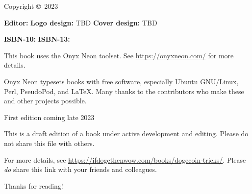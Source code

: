 \thispagestyle{empty}

\huge{\booktitle}
\newline
\large{\booksubtitle}
\newline
\newline
\normalsize

Copyright \copyright~2023 \bookauthor

\vfill
\textbf{Editor:} \bookauthor\newline
\textbf{Logo design:} TBD\newline
\textbf{Cover design:} TBD

\textbf{ISBN-10:} \bookisbnten\newline
\textbf{ISBN-13:} \bookisbnthirteen

This book uses the Onyx Neon toolset. See \url{https://onyxneon.com/} for more
details.

Onyx Neon typesets books with free software, especially Ubuntu GNU/Linux, Perl,
PseudoPod, and \LaTeX. Many thanks to the contributors who make these and other
projects possible.

First edition coming late 2023

This is a draft edition of a book under active development and editing. Please do not share this file with others.

For more details, see \url{https://ifdogethenwow.com/books/dogecoin-tricks/}.
Please \emph{do} share this link with your friends and colleagues.

Thanks for reading!
